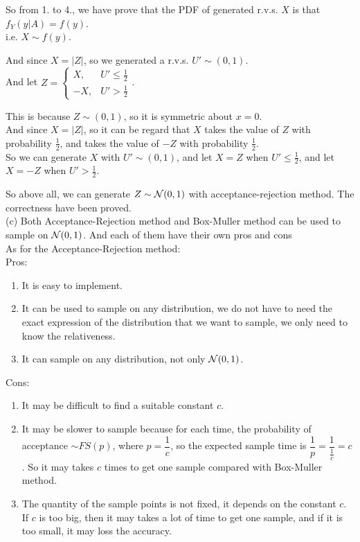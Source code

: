 \begin{homeworkProblem}
So from 1. to 4., we have prove that the PDF of generated r.v.s. $X$ is that $f_Y(y|A)=f(y)$.\\
i.e. $X\sim f(y)$.

And since $X=|Z|$, so we generated a r.v.s. $U'\sim (0,1)$.\\
And let $Z=\begin{cases}
    X, & U'\leq \frac{1}{2}\\
    -X, & U'>\frac{1}{2}
\end{cases}$.

This is because $Z\sim(0,1)$, so it is symmetric about $x=0$.\\
And since $X=|Z|$, so it can be regard that $X$ takes the value of $Z$ with probability $\frac{1}{2}$, and takes the value of $-Z$ with probability $\frac{1}{2}$.\\
So we can generate $X$ with $U'\sim (0,1)$, and let $X=Z$ when $U'\leq \frac{1}{2}$, and let $X=-Z$ when $U'>\frac{1}{2}$.

So above all, we can generate $Z\sim \mathcal{N}(0,1)$ with acceptance-rejection method. The correctness have been proved.\\

(c) Both Acceptance-Rejection method and Box-Muller method can be used to sample on $\mathcal{N}(0,1)$. And each of them have their own pros and cons\\
As for the Acceptance-Rejection method: \\
Pros:
\begin{enumerate}
    \item It is easy to implement.
    \item It can be used to sample on any distribution, we do not have to need the exact expression of the distribution that we want to sample, we only need to know the relativeness.
    \item It can sample on any distribution, not only $\mathcal{N}(0,1)$.
\end{enumerate}
Cons:
\begin{enumerate}
    \item It may be difficult to find a suitable constant $c$.
    \item It may be slower to sample because for each time, the probability of acceptance $\sim FS(p)$, where $p=\dfrac{1}{c}$, so the expected sample time is $\dfrac{1}{p}=\dfrac{1}{\frac{1}{c}}=c$.
    So it may takes $c$ times to get one sample compared with Box-Muller method.
    \item The quantity of the sample points is not fixed, it depends on the constant $c$. If $c$ is too big, then it may takes a lot of time to get one sample, and if it is too small, it may loss the accuracy.
\end{enumerate}


\end{homeworkProblem}
